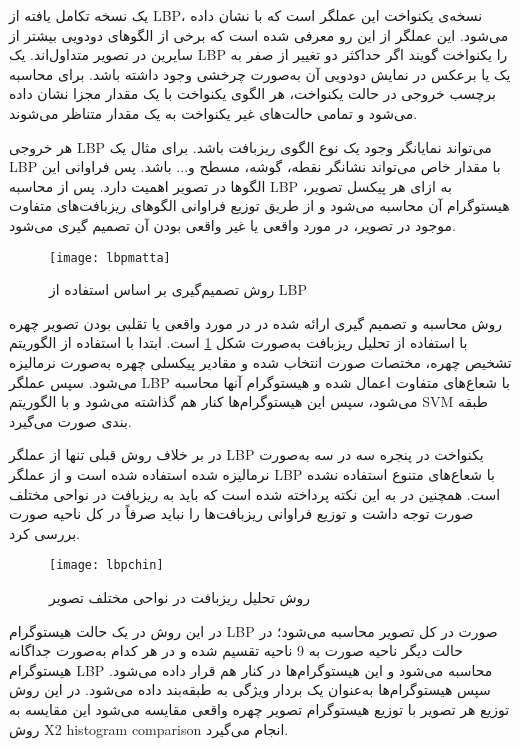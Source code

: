 یک نسخه تکامل یافته از LBP، نسخه‌ی یکنواخت این عملگر است که با  نشان داده می‌شود. این عملگر از این رو معرفی شده است که برخی از الگوهای دودویی بیشتر از سایرین در تصویر متداول‌اند. یک LBP را یکنواخت گویند اگر حداکثر دو تغییر از صفر به یک یا برعکس در نمایش دودویی آن به‌صورت چرخشی وجود داشته باشد. برای محاسبه برچسب خروجی در حالت یکنواخت، هر الگوی یکنواخت با یک مقدار مجزا نشان داده می‌شود و تمامی حالت‌های غیر یکنواخت به یک مقدار متناظر می‌شوند.

هر خروجی LBP می‌تواند نمایانگر وجود یک نوع الگوی ریزبافت باشد. برای مثال یک LBP با مقدار خاص می‌تواند نشانگر نقطه، گوشه، مسطح و... باشد. پس فراوانی این الگوها در تصویر اهمیت دارد. پس از محاسبه LBP به ازای هر پیکسل تصویر، هیستوگرام آن محاسبه می‌شود و از طریق توزیع فراوانی الگوهای ریزبافت‌های متفاوت موجود در تصویر، در مورد واقعی یا غیر واقعی بودن آن تصمیم گیری می‌شود.
\begin{figure}[hb]
	\centerline{\texttt{[image: lbpmatta]}}
	\caption{روش تصمیم‌گیری بر اساس استفاده از LBP \cite{maatta2011face}}
	\label{fig:lbpmatta}
\end{figure}

روش محاسبه و تصمیم گیری ارائه شده در 
\cite{maatta2011face}
در مورد واقعی یا تقلبی بودن تصویر چهره با استفاده از تحلیل ریزبافت به‌صورت شکل
\ref{fig:lbpmatta}
است.
ابتدا با استفاده از الگوریتم تشخیص چهره، مختصات صورت انتخاب شده و مقادیر پیکسلی چهره به‌صورت نرمالیزه می‌شود. سپس عملگر LBP با شعاع‌های متفاوت اعمال شده و هیستوگرام آنها محاسبه می‌شود، سپس این هیستوگرام‌ها کنار هم گذاشته می‌شود و با الگوریتم SVM طبقه بندی صورت می‌گیرد.

در 
\cite{chingovska2012effectiveness}
بر خلاف روش قبلی تنها از عملگر LBP یکنواخت در پنجره سه در سه به‌صورت نرمالیزه شده استفاده شده است و از عملگر LBP با شعاع‌های متنوع 
\cite{maatta2011face}
استفاده نشده است. همچنین در 
\cite{chingovska2012effectiveness}
به این نکته پرداخته شده است که باید به ریزبافت در نواحی مختلف صورت توجه داشت و توزیع فراوانی ریزبافت‌ها را نباید صرفاً در کل ناحیه صورت بررسی کرد.
\begin{figure}[t]
	\centerline{\texttt{[image: lbpchin]}}
	\caption{روش تحلیل ریزبافت در نواحی مختلف تصویر \cite{chingovska2012effectiveness}}
	\label{fig:lbpchin}
\end{figure}
در این روش در یک حالت هیستوگرام LBP صورت در کل تصویر محاسبه می‌شود؛ در حالت دیگر ناحیه صورت به 9 ناحیه تقسیم شده و در هر کدام به‌صورت جداگانه هیستوگرام LBP محاسبه می‌شود و این هیستوگرام‌ها در کنار هم قرار داده می‌شود. سپس هیستوگرام‌ها به‌عنوان یک بردار ویژگی به طبقه‌بند داده می‌شود. در این روش توزیع هر تصویر با توزیع هیستوگرام تصویر چهره واقعی مقایسه می‌شود این مقایسه به روش X2 histogram comparison انجام می‌گیرد.

